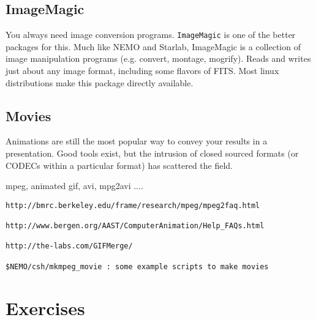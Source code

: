 
\section{ImageMagic}

You always need image conversion programs. {\tt ImageMagic} is one of 
the better packages for this. Much like NEMO and Starlab, ImageMagic
is a collection of image manipulation programs (e.g. convert, montage, mogrify).
Reads and writes just about any image format, including some flavors
of FITS. Most linux
distributions make this package directly available.


\section{Movies}

Animations are still the most popular way to convey your results
in a presentation. Good tools exist, but the intrusion of closed
sourced formats (or CODECs within a particular format)
has scattered the field.

mpeg, animated gif, avi, mpg2avi ....

\begin{verbatim}
http://bmrc.berkeley.edu/frame/research/mpeg/mpeg2faq.html

http://www.bergen.org/AAST/ComputerAnimation/Help_FAQs.html

http://the-labs.com/GIFMerge/

$NEMO/csh/mkmpeg_movie : some example scripts to make movies

\end{verbatim} 
\chapter                {Exercises}

